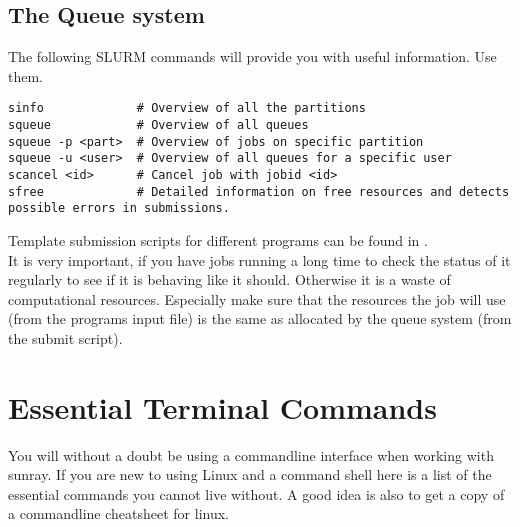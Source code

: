 \documentclass{article}
\begin{document}
\subsection*{The Queue system}

The following SLURM commands will provide you with useful information. Use them.

\begin{lstlisting}
sinfo             # Overview of all the partitions
squeue            # Overview of all queues
squeue -p <part>  # Overview of jobs on specific partition
squeue -u <user>  # Overview of all queues for a specific user
scancel <id>      # Cancel job with jobid <id>
sfree             # Detailed information on free resources and detects possible errors in submissions.
\end{lstlisting}

Template submission scripts for different programs can be found in .\\

It is very important, if you have jobs running a long time to check the status of it regularly to see if it is behaving like it should. Otherwise it is a waste of computational resources.
Especially make sure that the resources the job will use (from the programs input file) is the same as allocated by the queue system (from the submit script).\\



\newpage


\section{Essential Terminal Commands}

You will without a doubt be using a commandline interface when working with sunray.
If you are new to using Linux and a command shell here is a list of the essential commands you cannot live without.
A good idea is also to get a copy of a commandline cheatsheet for linux.\\
\end{document}
